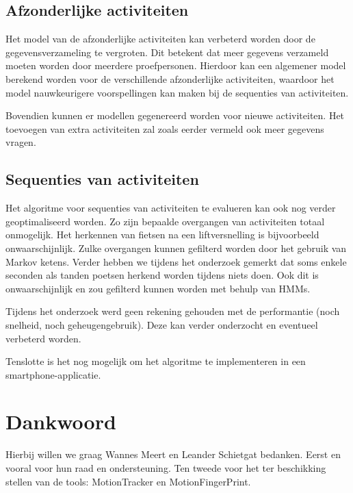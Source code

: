 \documentclass{article}
\begin{document}
\subsection{Afzonderlijke activiteiten}

Het model van de afzonderlijke activiteiten kan verbeterd worden door de gegevensverzameling te vergroten. Dit betekent dat meer gegevens verzameld moeten worden door meerdere proefpersonen. Hierdoor kan een algemener model berekend worden voor de verschillende afzonderlijke activiteiten, waardoor het model nauwkeurigere voorspellingen kan maken bij de sequenties van activiteiten.

Bovendien kunnen er modellen gegenereerd worden voor nieuwe activiteiten. Het toevoegen van extra activiteiten zal zoals eerder vermeld ook meer gegevens vragen.

\subsection{Sequenties van activiteiten}

Het algoritme voor sequenties van activiteiten te evalueren kan ook nog verder geoptimaliseerd worden. 
	Zo zijn bepaalde overgangen van activiteiten totaal onmogelijk. Het herkennen van fietsen na een liftversnelling is bijvoorbeeld onwaarschijnlijk. Zulke overgangen kunnen gefilterd worden door het gebruik van Markov ketens. Verder hebben we tijdens het onderzoek gemerkt dat soms enkele seconden als tanden poetsen herkend worden tijdens niets doen. Ook dit is onwaarschijnlijk en zou gefilterd kunnen worden met behulp van HMMs.

Tijdens het onderzoek werd geen rekening gehouden met de performantie (noch snelheid, noch geheugengebruik). Deze kan verder onderzocht en eventueel verbeterd worden.

	


Tenslotte is het nog mogelijk om het algoritme te implementeren in een smartphone-applicatie.

\section{Dankwoord}

Hierbij willen we graag Wannes Meert en Leander Schietgat bedanken. Eerst en vooral voor hun raad en ondersteuning. Ten tweede voor het ter beschikking stellen van de tools: MotionTracker en MotionFingerPrint.

\end{document}

